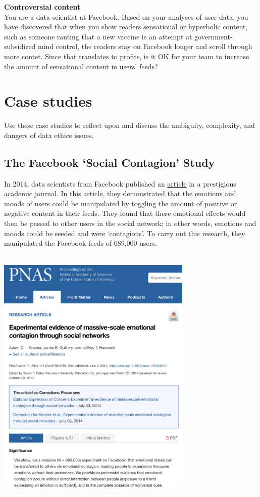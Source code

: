 \documentclass[]{book}
\begin{document}
\textbf{Controversial content}\\
You are a data scientist at Facebook. Based on your analyses of user data, you have discovered that when you show readers sensational or hyperbolic content, such as someone ranting that a new vaccine is an attempt at government-subsidized mind control, the readers stay on Facebook longer and scroll through more contet. Since that translates to profits, is it OK for your team to increase the amount of sensational content in users' feeds?

\hypertarget{case-studies}{%
\section*{Case studies}\label{case-studies}}

Use these case studies to reflect upon and discuss the ambiguity, complexity, and dangers of data ethics issues.

\hypertarget{the-facebook-social-contagion-study}{%
\subsection*{The Facebook `Social Contagion' Study}\label{the-facebook-social-contagion-study}}

In 2014, data scientists from Facebook published an \href{https://www.pnas.org/content/111/24/8788}{article} in a prestigious academic journal. In this article, they demonstrated that the emotions and moods of users could be manipulated by toggling the amount of positive or negative content in their feeds. They found that these emotional effects would then be passed to other users in the social network; in other words, emotions and moods could be seeded and were `contagious'. To carry out this research, they manipulated the Facebook feeds of 689,000 users.

~\\

\includegraphics[width=0.7\textwidth,height=\textheight]{img/ethics-fb.png}
\end{document}
